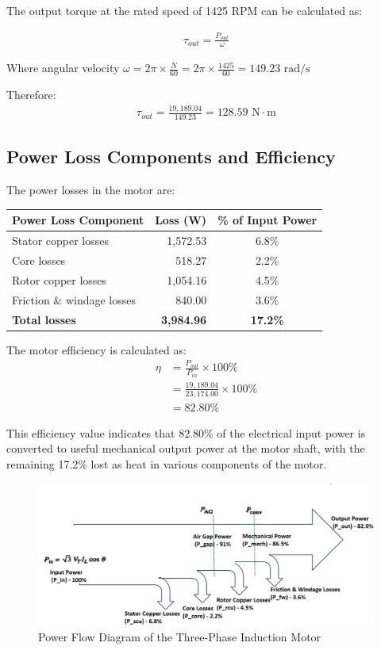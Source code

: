 \documentclass[a4paper,12pt]{IEEEtran}
\begin{document}
The output torque at the rated speed of 1425 RPM can be calculated as:

\begin{align}
    \tau_{out} = \frac{P_{out}}{\omega}
\end{align}

Where angular velocity $\omega = 2\pi \times \frac{N}{60} = 2\pi \times \frac{1425}{60} = 149.23 \text{ rad/s}$

Therefore:
\begin{align}
    \tau_{out} = \frac{19,189.04}{149.23} = 128.59 \text{ N}\cdot\text{m}
\end{align}

\subsection{Power Loss Components and Efficiency}

The power losses in the motor are:

 
\begin{center}
\begin{tabular}{|l|r|c|}
\hline
\textbf{Power Loss Component} & \textbf{Loss (W)} & \textbf{\% of Input Power} \\
\hline
Stator copper losses & 1,572.53 & 6.8\% \\
Core losses & 518.27 & 2.2\% \\
Rotor copper losses & 1,054.16 & 4.5\% \\
Friction \& windage losses & 840.00 & 3.6\% \\
\hline
\textbf{Total losses} & \textbf{3,984.96} & \textbf{17.2\%} \\
\hline
\end{tabular}
\end{center}

The motor efficiency is calculated as:
\begin{align}
    \eta &= \frac{P_{out}}{P_{in}} \times 100\% \\
    &= \frac{19,189.04}{23,174.00} \times 100\% \\
    &= 82.80\%
\end{align}

This efficiency value indicates that 82.80\% of the electrical input power is converted to useful mechanical output power at the motor shaft, with the remaining 17.2\% lost as heat in various components of the motor.

 
\begin{figure}[h]
    \centering
    \includegraphics[width=\textwidth]{power_flow_diagram.png}
    \caption{Power Flow Diagram of the Three-Phase Induction Motor}
    \label{fig:power_flow}
\end{figure} 
\end{document}
